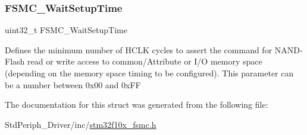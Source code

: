 \subsubsection{\texorpdfstring{FSMC\_WaitSetupTime}{FSMC\_WaitSetupTime}}
{\footnotesize\ttfamily uint32\+\_\+t F\+S\+M\+C\+\_\+\+Wait\+Setup\+Time}

Defines the minimum number of H\+C\+LK cycles to assert the command for N\+A\+N\+D-\/\+Flash read or write access to common/\+Attribute or I/O memory space (depending on the memory space timing to be configured). This parameter can be a number between 0x00 and 0x\+FF 

The documentation for this struct was generated from the following file\+:\begin{DoxyCompactItemize}
\item 
Std\+Periph\+\_\+\+Driver/inc/\mbox{\hyperlink{stm32f10x__fsmc_8h}{stm32f10x\+\_\+fsmc.\+h}}\end{DoxyCompactItemize}
